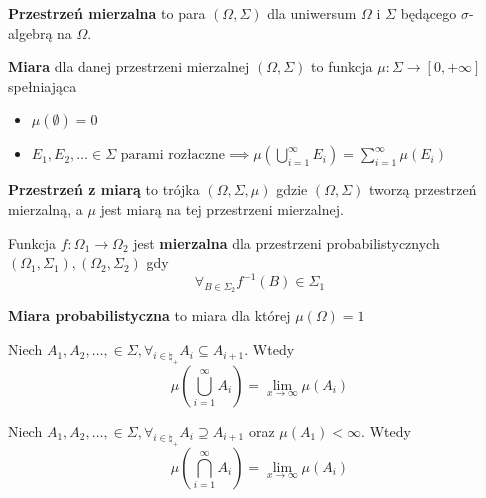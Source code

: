 \begin{definition}
	\textbf{Przestrzeń mierzalna} to para \((\Omega, \Sigma)\) dla uniwersum \(\Omega\) i \(\Sigma\) będącego \(\sigma\)-algebrą na \(\Omega\).
\end{definition}

\begin{definition}
	\textbf{Miara} dla danej przestrzeni mierzalnej \((\Omega, \Sigma)\) to funkcja \(\mu: \Sigma \to [0, +\infty]\) spełniająca
	\begin{itemize}
		\item \(\mu(\emptyset) = 0\)
		\item \(E_1, E_2, \dots \in \Sigma \text{ parami rozłaczne} \implies \mu(\bigcup_{i=1}^\infty E_i) = \sum_{i=1}^{\infty} \mu(E_i)\)
	\end{itemize}
\end{definition}

\begin{definition}
	\textbf{Przestrzeń z miarą} to trójka \((\Omega, \Sigma, \mu)\) gdzie \((\Omega, \Sigma)\) tworzą przestrzeń mierzalną, a \(\mu\) jest miarą na tej przestrzeni mierzalnej.
\end{definition}

\begin{definition}
	Funkcja \(f: \Omega_1 \to \Omega_2\) jest \textbf{mierzalna} dla przestrzeni probabilistycznych \((\Omega_1, \Sigma_1), (\Omega_2, \Sigma_2)\) gdy
	\[
		\forall_{B \in \Sigma_2} f^{-1}(B) \in \Sigma_1
	\]
\end{definition}

\begin{definition}
	\textbf{Miara probabilistyczna} to miara dla której \(\mu(\Omega) = 1\)
\end{definition}

\begin{lemma}
	Niech \(A_1, A_2, \dots, \in \Sigma, \forall_{i \in \natural_+} A_i \subseteq A_{i+1}\). Wtedy
	\[
		\mu(\bigcup_{i=1}^\infty A_i) = \lim_{x \to \infty} \mu(A_i)
	\]
\end{lemma}

\begin{lemma}
	Niech \(A_1, A_2, \dots, \in \Sigma, \forall_{i \in \natural_+} A_i \supseteq A_{i+1}\) oraz \(\mu(A_1) < \infty\). Wtedy
	\[
		\mu(\bigcap_{i=1}^\infty A_i) = \lim_{x \to \infty} \mu(A_i)
	\]
\end{lemma}

